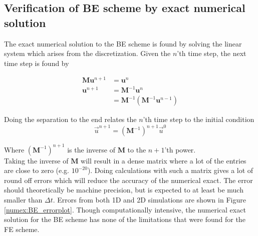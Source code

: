 \subsection{Verification of BE scheme by exact numerical solution}

The exact numerical solution to the BE scheme is found by solving the linear system which arises from the discretization. 
Given the $n$'th time step, the next time step is found by

\begin{align*}
 \mathbf M \mathbf u^{n+1} &= \mathbf{u}^n \\
 \mathbf{u}^{n+1} &= \mathbf{M}^{-1} \mathbf{u}^n \\
 &= \mathbf{M}^{-1}\left(\mathbf{M}^{-1} \mathbf{u}^{n-1}\right)
\end{align*}

\noindent Doing the separation to the end relates the $n$'th time step to the initial condition
\begin{equation}\label{BE_numex}
 \vec u^{n+1} = \left(\mathbf M^{-1}\right)^{n+1} \vec u^0
\end{equation}

\noindent Where $\left(\mathbf M^{-1}\right)^{n+1}$ is the inverse of $\mathbf M$ to the $n+1$'th power.\\

Taking the inverse of $\mathbf M$ will result in a dense matrix where a lot of the entries are close to zero (e.g. $10^{-20}$). 
Doing calculations with such a matrix gives a lot of round off errors which will reduce the accuracy of the numerical exact. 
The error should theoretically be machine precision, but is expected to at least be much smaller than $\Delta t$. 
Errors from both 1D and 2D simulations are shown in Figure \ref{numex:BE_errorplot}. 
Though computationally intensive, the numerical exact solution for the BE scheme has none of the limitations that were found for the FE scheme. 

